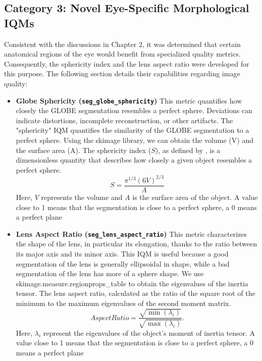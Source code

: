 \subsection{Category 3: Novel Eye-Specific Morphological IQMs}
\label{ssec:new_eye_iqms}
Consistent with the discussions in Chapter 2, it was determined that certain anatomical regions of the eye would benefit from specialized quality metrics. Consequently, the sphericity index and the lens aspect ratio were developed for this purpose. The following section details their capabilities regarding image quality:
\begin{itemize}
    \item \textbf{Globe Sphericity (\texttt{seg\_globe\_sphericity})} This metric quantifies how closely the GLOBE segmentation resembles a perfect sphere. Deviations can indicate distortions, incomplete reconstruction, or other artifacts. The "sphericity" IQM quantifies the similarity of the GLOBE segmentation to a perfect sphere. Using the skimage library, we can obtain the volume (V) and the surface area (A). The sphericity index ($S$), as defined by \cite{bullard_defining_2013}, is a dimensionless quantity that describes how closely a given object resembles a perfect sphere.
    \begin{equation}
        S = \frac{\pi^{1/3} (6V)^{2/3}}{A}
    \label{eq:sphericity_index}
\end{equation}
Here, $V$ represents the volume and $A$ is the surface area of the object. A value close to 1 means that the segmentation is close to a perfect sphere, a 0 means a perfect plane
    \item \textbf{Lens Aspect Ratio (\texttt{seg\_lens\_aspect\_ratio})} This metric characterizes the shape of the lens, in particular its elongation, thanks to the ratio between its major axis and its minor axis. This IQM is useful because a good segmentation of the lens is generally ellipsoidal in shape, while a bad segmentation of the lens has more of a sphere shape. We use skimage.measure.regionprops\_table to obtain the eigenvalues of the inertia tensor. The lens aspect ratio, calculated as the ratio of the square root of the minimum to the maximum eigenvalues of the second moment matrix.
    \begin{equation}
        AspectRatio = \frac{\sqrt{\min(\lambda_i)}}{\sqrt{\max(\lambda_i)}}.
        \label{eq:aspect_ratio_definition}
    \end{equation}
    Here, $\lambda_i$ represent the eigenvalues of the object's moment of inertia tensor. A value close to 1 means that the segmentation is close to a perfect sphere, a 0 means a perfect plane

\end{itemize}

